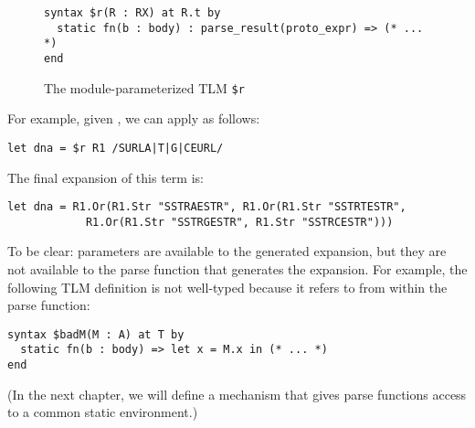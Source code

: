 \begin{figure}[h]
\begin{lstlisting}
syntax $r(R : RX) at R.t by 
  static fn(b : body) : parse_result(proto_expr) => (* ... *)
end
\end{lstlisting}
\vspace{-8px}
\caption{The module-parameterized TLM \texttt{\$r}}
\label{fig:param-tsm-r}
\vspace{-4px}
\end{figure}
\noindent
For example, given , we can apply  as follows:
\begin{lstlisting}[numbers=none]
let dna = $r R1 /SURLA|T|G|CEURL/
\end{lstlisting}
The final expansion of this term is:
\begin{lstlisting}[numbers=none]
let dna = R1.Or(R1.Str "SSTRAESTR", R1.Or(R1.Str "SSTRTESTR", 
	        R1.Or(R1.Str "SSTRGESTR", R1.Str "SSTRCESTR")))
\end{lstlisting}

To be clear: parameters are available to the generated expansion, but they are not available to the parse function that generates the expansion. For example, the following TLM definition is not well-typed because it refers to  from within the parse function:
\begin{lstlisting}[numbers=none]
syntax $badM(M : A) at T by 
  static fn(b : body) => let x = M.x in (* ... *)
end
\end{lstlisting}
(In the next chapter, we will define a mechanism that gives parse functions access to a common static environment.)

